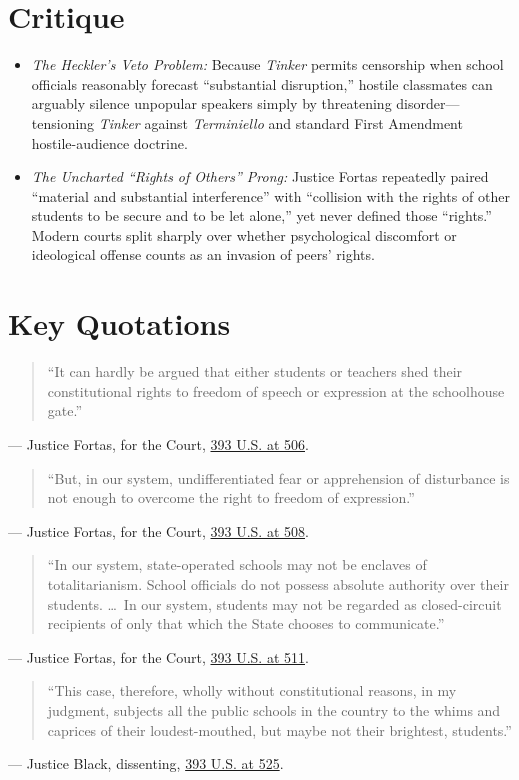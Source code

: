 \documentclass[12pt]{article}
\begin{document}
\section{Critique}
\begin{itemize}
  \item \textit{The Heckler's Veto Problem:} Because \textit{Tinker} permits censorship when school officials reasonably forecast ``substantial disruption,'' hostile classmates can arguably silence unpopular speakers simply by threatening disorder---tensioning \textit{Tinker} against \textit{Terminiello} and standard First Amendment hostile-audience doctrine.
  \item \textit{The Uncharted ``Rights of Others'' Prong:} Justice Fortas repeatedly paired ``material and substantial interference'' with ``collision with the rights of other students to be secure and to be let alone,'' yet never defined those ``rights.'' Modern courts split sharply over whether psychological discomfort or ideological offense counts as an invasion of peers' rights.
\end{itemize}

\section{Key Quotations}
\begin{quote}
``It can hardly be argued that either students or teachers shed their constitutional rights to freedom of speech or expression at the schoolhouse gate.''
\end{quote}
\noindent --- Justice Fortas, for the Court, \href{https://supreme.justia.com/cases/federal/us/393/503/}{393 U.S. at 506}.

\begin{quote}
``But, in our system, undifferentiated fear or apprehension of disturbance is not enough to overcome the right to freedom of expression.''
\end{quote}
\noindent --- Justice Fortas, for the Court, \href{https://supreme.justia.com/cases/federal/us/393/503/}{393 U.S. at 508}.

\begin{quote}
``In our system, state-operated schools may not be enclaves of totalitarianism. School officials do not possess absolute authority over their students. \dots\ In our system, students may not be regarded as closed-circuit recipients of only that which the State chooses to communicate.''
\end{quote}
\noindent --- Justice Fortas, for the Court, \href{https://supreme.justia.com/cases/federal/us/393/503/}{393 U.S. at 511}.

\begin{quote}
``This case, therefore, wholly without constitutional reasons, in my judgment, subjects all the public schools in the country to the whims and caprices of their loudest-mouthed, but maybe not their brightest, students.''
\end{quote}
\noindent --- Justice Black, dissenting, \href{https://supreme.justia.com/cases/federal/us/393/503/}{393 U.S. at 525}.
\end{document}
